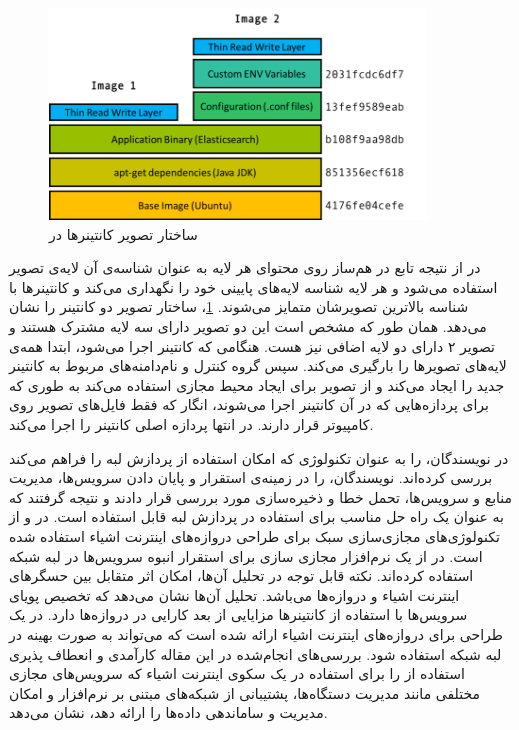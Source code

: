     \begin{figure}[]
      \centerline{\includegraphics[width=10cm]{graphics/chapter_2/docker_image}}
      \caption{ساختار تصویر کانتینر‌ها در  \cite{2019demystifying}}
      \label{fig:chapter_2:docker_image}
    \end{figure}

    در  از نتیجه تابع در هم‌ساز  روی محتوای هر لایه به عنوان شناسه‌ی آن لایه‌ی تصویر استفاده می‌شود و هر لایه شناسه لایه‌های پایینی خود را نگهداری می‌کند و کانتینر‌ها با شناسه بالاترین تصویرشان متمایز می‌شوند.
    \cref{fig:chapter_2:docker_image}، ساختار تصویر دو کانتینر را نشان می‌دهد.
    همان طور که مشخص است این دو تصویر دارای سه لایه مشترک هستند و تصویر ۲ دارای دو لایه اضافی نیز هست.
    هنگامی که کانتینر اجرا می‌شود،  ابتدا همه‌ی لایه‌های تصویر‌ها را بارگیری می‌کند.
    سپس گروه کنترل و نام‌دامنه‌های مربوط به کانتینر جدید را ایجاد می‌کند و از تصویر برای ایجاد محیط مجازی استفاده می‌کند به طوری که برای پردازه‌هایی که در آن کانتینر اجرا می‌شوند، انگار که فقط فایل‌های تصویر روی کامپیوتر قرار دارند.
    در انتها پردازه اصلی کانتینر را اجرا می‌کند.

    در \cite{ismail2015evaluation} نویسندگان،  را به عنوان تکنولوژی که امکان استفاده از پردازش لبه را فراهم می‌کند بررسی کرده‌اند.
    نویسندگان،  را در زمینه‌ی استقرار و پایان دادن سرویس‌ها، مدیریت منابع و سرویس‌ها، تحمل خطا و ذخیره‌سازی مورد بررسی قرار دادند و نتیجه گرفتند که  به عنوان یک راه حل مناسب برای استفاده در پردازش لبه قابل استفاده است.
    در \cite{viswanath2016system} و \cite{morabito2016enabling} از تکنولوژی‌های مجازی‌سازی سبک برای طراحی دروازه‌های اینترنت اشیاء استفاده شده است.
    در \cite{viswanath2016system} از یک نرم‌افزار مجازی سازی برای استقرار انبوه سرویس‌ها در لبه شبکه استفاده کرده‌اند.
    نکته قابل توجه در تحلیل آن‌ها، امکان اثر متقابل بین حسگر‌های اینترنت اشیاء و دروازه‌‌ها می‌باشد.
    تحلیل آن‌ها نشان می‌دهد که تخصیص پویای سرویس‌ها با استفاده از کانتینر‌ها مزایایی از بعد کارایی در دروازه‌ها دارد.
    در \cite{morabito2016enabling} یک طراحی برای دروازه‌های اینترنت اشیاء ارائه شده است که می‌تواند به صورت بهینه در لبه شبکه استفاده شود.
    بررسی‌های انجام‌شده در این مقاله کارآمدی و انعطاف پذیری استفاده از  را برای استفاده در یک سکوی‌ اینترنت اشیاء که سرویس‌های مجازی مختلفی مانند مدیریت دستگاه‌ها، پشتیبانی از شبکه‌های مبتنی بر نرم‌افزار و امکان مدیریت و ساماندهی داده‌ها را ارائه دهد، نشان می‌دهد.

